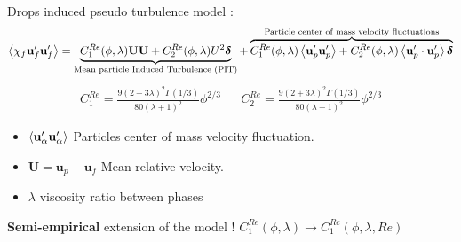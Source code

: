 \documentclass{sintefbeamer}
\begin{document}
\begin{frame}
  {
  Drops induced pseudo turbulence model : 
  }
  \small
  \begin{equation*}
    \left<\chi_f  \textbf{u}_f' \textbf{u}_f'\right>
    =
    \underbrace{
      C^{Re}_1(\phi,\lambda)\textbf{UU}
    + C^{Re}_2(\phi,\lambda)U^2 \bm\delta}_\text{Mean particle Induced Turbulence (PIT)}
    + \overbrace{C^{Re}_1(\phi,\lambda)\left<\textbf{u}_p'\textbf{u}_p'\right>
    + C^{Re}_2(\phi,\lambda)\left<\textbf{u}_{p}'\cdot \textbf{u}_{p}'\right>\bm\delta
    }^{\text{Particle center of mass velocity fluctuations}}
  \end{equation*}
  \begin{align*}
    C^{Re}_{1} = \frac{9(2+3\lambda)^2 \Gamma(1/3)}{80 (\lambda +1)^2}\phi^{2/3} 
    &&
    C^{Re}_2 = \frac{9(2+3\lambda)^2 \Gamma(1/3)}{80 (\lambda +1)^2}\phi^{2/3} 
  \end{align*}
  \begin{itemize}
    \item $\left<\textbf{u}_\alpha'\textbf{u}_\alpha'\right>$ Particles center of mass velocity fluctuation.  
    \item $\textbf{U} = \textbf{u}_p - \textbf{u}_f$ Mean relative velocity. 
    \item $\lambda$ viscosity ratio between phases
  \end{itemize}
\vfill
\textbf{Semi-empirical} extension of the model !
$C^{Re}_1(\phi, \lambda ) \to C^{Re}_1(\phi, \lambda ,Re) $ 

\end{frame}
\end{document}

